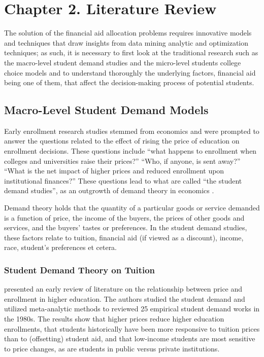 \documentclass[12pt,english]{report}
\begin{document}
\chapter{Chapter 2. Literature Review}
The solution of the financial aid allocation problems requires innovative models and techniques that draw insights from data mining analytic and optimization techniques; as such, it is necessary to first look at the traditional research such as the macro-level student demand studies and the micro-level students college choice models and to understand  thoroughly the underlying factors, financial aid being one of them, that affect the decision-making process of potential students.

\section{Macro-Level Student Demand Models}
Early enrollment research studies stemmed from economics and were prompted to answer the questions related to the effect of rising the price of education on enrollment decisions. These questions include  ``what happens to enrollment when colleges and universities raise their prices?''  ``Who, if anyone, is sent away?''  ``What is the net impact of higher prices and reduced enrollment upon institutional finances?''  These questions  lead to what are called ``the student demand studies'', as an outgrowth of demand theory in economics \citep{Leslie1987,  Leslie1988, Heller1997, Ehrenberg2004, Crouse2015}.

Demand theory holds that the quantity of a particular goods or service demanded is a function of price, the income of the buyers, the prices of other goods and services, and the buyers' tastes or preferences. In the student demand studies, these factors relate to tuition, financial aid (if viewed as a discount), income, race, student's preferences et cetera.

\subsection{Student Demand Theory on Tuition}
\citet{Leslie1987} presented an early review of literature on the relationship between price and enrollment in higher education. The authors studied the student demand and utilized meta-analytic methods to reviewed 25 empirical student demand works in the 1980s. The results show that higher prices reduce higher education enrollments, that students historically have been more responsive to tuition prices than to (offsetting) student aid, and that low-income students are most sensitive to price changes, as are students in public versus private institutions.
\end{document}
